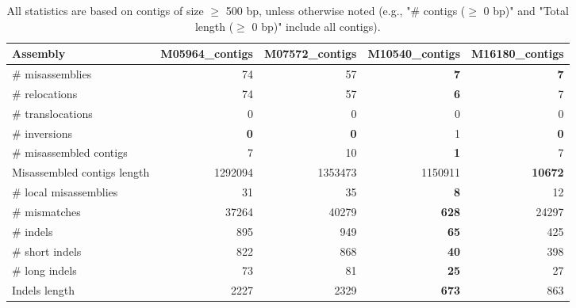 \documentclass[12pt,a4paper]{article}
\begin{document}
\begin{table}[ht]
\begin{center}
\caption{All statistics are based on contigs of size $\geq$ 500 bp, unless otherwise noted (e.g., "\# contigs ($\geq$ 0 bp)" and "Total length ($\geq$ 0 bp)" include all contigs).}
\begin{tabular}{|l*{4}{|r}|}
\hline
Assembly & M05964\_contigs & M07572\_contigs & M10540\_contigs & M16180\_contigs \\ \hline
\# misassemblies & 74 & 57 & {\bf 7} & {\bf 7} \\ \hline
\hspace{5mm}\# relocations & 74 & 57 & {\bf 6} & 7 \\ \hline
\hspace{5mm}\# translocations & 0 & 0 & 0 & 0 \\ \hline
\hspace{5mm}\# inversions & {\bf 0} & {\bf 0} & 1 & {\bf 0} \\ \hline
\# misassembled contigs & 7 & 10 & {\bf 1} & 7 \\ \hline
Misassembled contigs length & 1292094 & 1353473 & 1150911 & {\bf 10672} \\ \hline
\# local misassemblies & 31 & 35 & {\bf 8} & 12 \\ \hline
\# mismatches & 37264 & 40279 & {\bf 628} & 24297 \\ \hline
\# indels & 895 & 949 & {\bf 65} & 425 \\ \hline
\hspace{5mm}\# short indels & 822 & 868 & {\bf 40} & 398 \\ \hline
\hspace{5mm}\# long indels & 73 & 81 & {\bf 25} & 27 \\ \hline
Indels length & 2227 & 2329 & {\bf 673} & 863 \\ \hline
\end{tabular}
\end{center}
\end{table}
\end{document}
